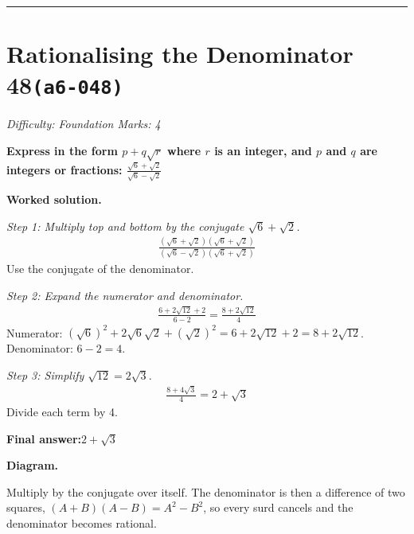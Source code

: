 \documentclass[11pt]{article}
\newcommand{\question}[1]{\par\medskip\noindent\textbf{#1}\par}
\begin{document}
\medskip\hrule

\section*{Rationalising the Denominator 48\quad\small\texttt{(a6-048)}}
\textit{Difficulty: Foundation \quad\textbar\quad Marks: 4}

\question{Express in the form \( p + q\sqrt{r} \) where \( r \) is an integer, and \( p \) and \( q \) are integers or fractions: \( \frac{\sqrt{6} + \sqrt{2}}{\sqrt{6} - \sqrt{2}} \)}

\textbf{Worked solution.}

\textit{Step 1: Multiply top and bottom by the conjugate \( \sqrt{6} + \sqrt{2} \).}
\[\begin{gathered}
\frac{(\sqrt{6} + \sqrt{2})(\sqrt{6} + \sqrt{2})}{(\sqrt{6} - \sqrt{2})(\sqrt{6} + \sqrt{2})}
\end{gathered}\]
Use the conjugate of the denominator.

\textit{Step 2: Expand the numerator and denominator.}
\[\begin{gathered}
\frac{6 + 2\sqrt{12} + 2}{6 - 2} = \frac{8 + 2\sqrt{12}}{4}
\end{gathered}\]
Numerator: \( (\sqrt{6})^2 + 2\sqrt{6}\sqrt{2} + (\sqrt{2})^2 = 6 + 2\sqrt{12} + 2 = 8 + 2\sqrt{12} \). Denominator: \( 6 - 2 = 4 \).

\textit{Step 3: Simplify \( \sqrt{12} = 2\sqrt{3} \).}
\[\begin{gathered}
\frac{8 + 4\sqrt{3}}{4} = 2 + \sqrt{3}
\end{gathered}\]
Divide each term by 4.

\begin{answerbox}
\textbf{Final answer:}\quad \(\displaystyle 2 + \sqrt{3}\)
\end{answerbox}
\textbf{Diagram.}

\begin{center}
\end{center}
\small Multiply by the conjugate over itself. The denominator is then a difference of two squares, $(A+B)(A-B)=A^{2}-B^{2}$, so every surd cancels and the denominator becomes rational.\normalsize
\end{document}
